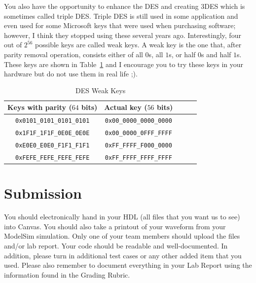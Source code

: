 \documentclass{article}
\begin{document}
You also have the opportunity to enhance the DES and creating 3DES
which is sometimes called triple DES.  Triple DES is still used in
some application and even used for some Microsoft keys that were used
when purchasing software; however, I think they stopped using these
several years ago.  Interestingly, four out of
$2^{56}$ possible keys are called weak keys.
A weak key is the one that, after parity removal operation,
consists either of all $0$s, all $1$s, or half $0$s and half $1$s.
These keys are shown in Table~\ref{weak.tbl} and I encourage you to
try these keys in your hardware but do not use them in real life ;).
\begin{table}
  \centering
  \begin{tabular}{|c|c|c|c|c|}\hline
    Keys with parity ($64$ bits) & Actual key ($56$ bits)
    \\ \hline \hline
    \verb!0x0101_0101_0101_0101! & \verb!0x00_0000_0000_0000! \\ \hline
    \verb!0x1F1F_1F1F_0E0E_0E0E! & \verb!0x00_0000_0FFF_FFFF! \\ \hline
    \verb!0xE0E0_E0E0_F1F1_F1F1! & \verb!0xFF_FFFF_F000_0000! \\ \hline
    \verb!0xFEFE_FEFE_FEFE_FEFE! & \verb!0xFF_FFFF_FFFF_FFFF! \\ \hline
  \end{tabular}
  \caption{DES Weak Keys}
  \label{weak.tbl}
  \end{table}


\section{Submission}

You should electronically hand in your HDL (all files that you want
us to see) into Canvas.
You should also take a printout of your waveform 
from your ModelSim simulation.  
Only one of your team members should upload
the files and/or lab report. Your
code should be
readable and well-documented. In addition, please turn in additional
test cases or any other added item that you used. 
Please also remember to document everything in your Lab Report using
the information found in the Grading Rubric.


    


\end{document}
